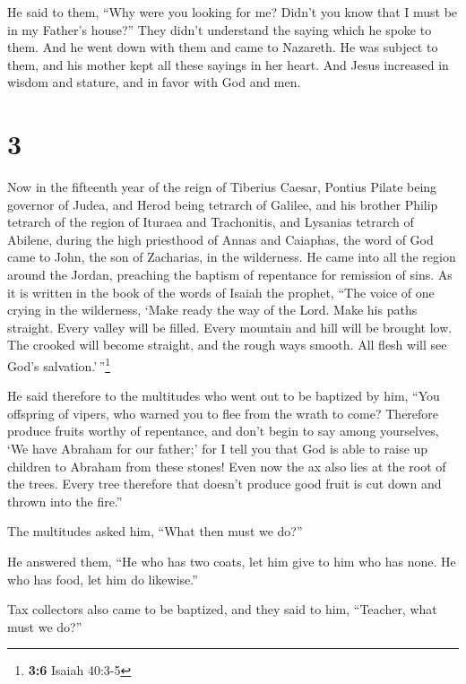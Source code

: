  He said to them, ``Why were you looking for me? Didn't
you know that I must be in my Father's house?''  They
didn't understand the saying which he spoke to them.  And
he went down with them and came to Nazareth. He was subject to them, and
his mother kept all these sayings in her heart.  And
Jesus increased in wisdom and stature, and in favor with God and men.

\hypertarget{section-2}{%
\section{3}\label{section-2}}

 Now in the fifteenth year of the reign of Tiberius
Caesar, Pontius Pilate being governor of Judea, and Herod being tetrarch
of Galilee, and his brother Philip tetrarch of the region of Ituraea and
Trachonitis, and Lysanias tetrarch of Abilene,  during the
high priesthood of Annas and Caiaphas, the word of God came to John, the
son of Zacharias, in the wilderness.  He came into all the
region around the Jordan, preaching the baptism of repentance for
remission of sins.  As it is written in the book of the
words of Isaiah the prophet, ``The voice of one crying in the
wilderness, `Make ready the way of the Lord. Make his paths straight.
 Every valley will be filled. Every mountain and hill will
be brought low. The crooked will become straight, and the rough ways
smooth.  All flesh will see God's
salvation.'\,''\footnote{\textbf{3:6} Isaiah 40:3-5}

 He said therefore to the multitudes who went out to be
baptized by him, ``You offspring of vipers, who warned you to flee from
the wrath to come?  Therefore produce fruits worthy of
repentance, and don't begin to say among yourselves, `We have Abraham
for our father;' for I tell you that God is able to raise up children to
Abraham from these stones!  Even now the ax also lies at
the root of the trees. Every tree therefore that doesn't produce good
fruit is cut down and thrown into the fire.''

 The multitudes asked him, ``What then must we do?''

 He answered them, ``He who has two coats, let him give
to him who has none. He who has food, let him do likewise.''

 Tax collectors also came to be baptized, and they said
to him, ``Teacher, what must we do?''

